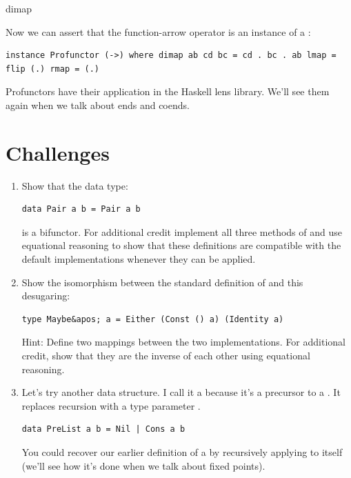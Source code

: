 dimap

Now we can assert that the function-arrow operator is an instance of a
:

\begin{verbatim}
instance Profunctor (->) where dimap ab cd bc = cd . bc . ab lmap = flip (.) rmap = (.)
\end{verbatim}

Profunctors have their application in the Haskell lens library. We'll
see them again when we talk about ends and coends.

\section{Challenges}\label{challenges}

\begin{enumerate}
\item
  Show that the data type:

\begin{verbatim}
data Pair a b = Pair a b
\end{verbatim}

  is a bifunctor. For additional credit implement all three methods of
   and use equational reasoning to show that these
  definitions are compatible with the default implementations whenever
  they can be applied.
\item
  Show the isomorphism between the standard definition of 
  and this desugaring:

\begin{verbatim}
type Maybe&apos; a = Either (Const () a) (Identity a)
\end{verbatim}

  Hint: Define two mappings between the two implementations. For
  additional credit, show that they are the inverse of each other using
  equational reasoning.
\item
  Let's try another data structure. I call it a  because
  it's a precursor to a . It replaces recursion with a type
  parameter .

\begin{verbatim}
data PreList a b = Nil | Cons a b
\end{verbatim}

  You could recover our earlier definition of a  by
  recursively applying  to itself (we'll see how it's
  done when we talk about fixed points).


\end{enumerate}
